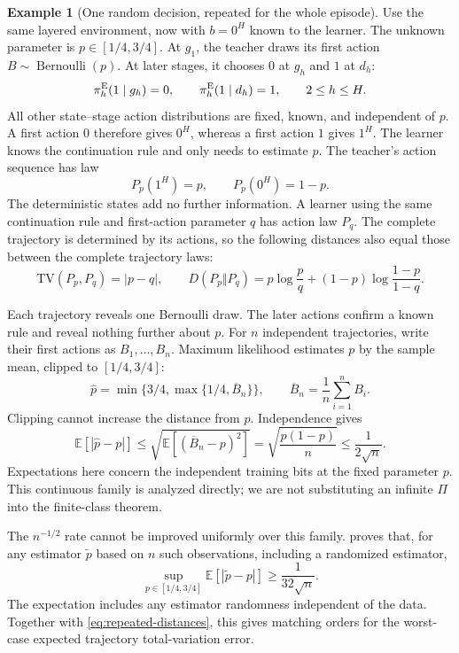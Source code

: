 \documentclass[11pt,twoside]{article}
\newcommand{\E}{\mathbb E}
\newcommand{\KL}{D}
\newcommand{\TV}{\mathrm{TV}}
\theoremstyle{definition}
\newtheorem{example}[theorem]{Example}
\theoremstyle{remark}
\begin{document}
\begin{example}[One random decision, repeated for the whole episode]
\label{ex:repeated-bit}
Use the same layered environment, now with $b=0^H$ known to the learner.
The unknown parameter is $p\in[1/4,3/4]$. At $g_1$, the teacher draws
its first action $B\sim\operatorname{Bernoulli}(p)$. At later stages,
it chooses $0$ at $g_h$ and $1$ at $d_h$:
\[
 \pi_h^{\rm E}(1\mid g_h)=0,\qquad
 \pi_h^{\rm E}(1\mid d_h)=1,\qquad 2\le h\le H.
\]
All other state--stage action distributions are fixed, known, and
independent of $p$. A first action $0$ therefore gives $0^H$, whereas
a first action $1$ gives $1^H$. The learner knows the continuation rule
and only needs to estimate $p$. The teacher's action sequence has law
\begin{equation}
 P_p(1^H)=p,\qquad P_p(0^H)=1-p.
 \label{eq:repeated-bit}
\end{equation}
The deterministic states add no further information. A learner using
the same continuation rule and first-action parameter $q$ has action law
$P_q$. The complete trajectory is determined by its actions, so the
following distances also equal those between the complete trajectory laws:
\begin{equation}
 \TV(P_p,P_q)=|p-q|,\qquad
 \KL(P_p\Vert P_q)
 =p\log\frac pq+(1-p)\log\frac{1-p}{1-q}.
 \label{eq:repeated-distances}
\end{equation}
\end{example}

Each trajectory reveals one Bernoulli draw. The later actions confirm a
known rule and reveal nothing further about $p$. For $n$ independent
trajectories, write their first actions as $B_1,\ldots,B_n$. Maximum
likelihood estimates $p$ by the sample mean, clipped to $[1/4,3/4]$:
\[
 \widehat p=\min\{3/4,\max\{1/4,\overline B_n\}\},
 \qquad \overline B_n=\frac1n\sum_{i=1}^n B_i.
\]
Clipping cannot increase the distance from $p$. Independence gives
\begin{equation}
 \E[|\widehat p-p|]
 \le \sqrt{\E[(\overline B_n-p)^2]}
 =\sqrt{\frac{p(1-p)}n}\le\frac1{2\sqrt n}.
 \label{eq:bernoulli-upper}
\end{equation}
Expectations here concern the independent training bits at the fixed
parameter $p$. This continuous family is analyzed directly; we are not
substituting an infinite $\Pi$ into the finite-class theorem.

The $n^{-1/2}$ rate cannot be improved uniformly over this family.
 proves that, for any estimator $\widetilde p$ based
on $n$ such observations, including a randomized estimator,
\begin{equation}
 \sup_{p\in[1/4,3/4]}\E[|\widetilde p-p|]\ge\frac1{32\sqrt n}.
 \label{eq:bernoulli-lower}
\end{equation}
The expectation includes any estimator randomness independent of the data.
Together with \cref{eq:repeated-distances}, this gives matching orders for
the worst-case expected trajectory total-variation error.
\end{document}
